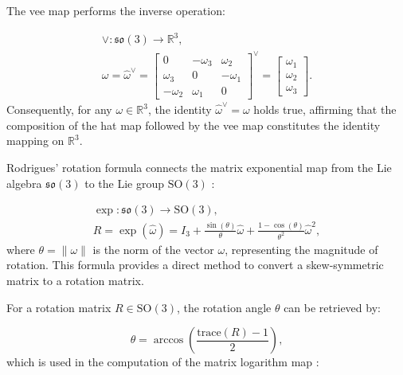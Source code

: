 The vee map performs the inverse operation:

\begin{equation}
    \begin{aligned}
        \vee : \mathfrak{so}(3) \rightarrow \mathbb{R}^3, \\
        \omega = \hat{\omega}^\vee =
        \begin{bmatrix} 0 & -\omega_3 & \omega_2 \\ \omega_3 & 0 & -\omega_1 \\ -\omega_2 & \omega_1 & 0 \end{bmatrix}^\vee
        =
        \begin{bmatrix} \omega_1 \\ \omega_2 \\ \omega_3 \end{bmatrix}.
    \end{aligned}
    \label{eq:vee_SO3}
\end{equation}
Consequently, for any \(\omega \in \mathbb{R}^3\), the identity \(\hat{\omega}^\vee = \omega\) holds true, affirming that the composition of the hat map followed by the vee map constitutes the identity mapping on \(\mathbb{R}^3\).


Rodrigues' rotation formula connects the matrix exponential map from the Lie algebra \(\mathfrak{so}(3)\) to the Lie group \(\mathrm{SO}(3)\) \cite{celledoniLieGroupMethods2003, maInvitation3DVision2004, gallegoCompactFormulaDerivative2015}:

\begin{equation}
    \begin{aligned}
        \exp : \mathfrak{so}(3) \rightarrow \mathrm{SO}(3), \\
        R = \exp(\hat{\omega}) = I_3 + \frac{\sin(\theta)}{\theta} \hat{\omega} + \frac{1 - \cos(\theta)}{\theta^2} \hat{\omega}^2,
    \end{aligned}
    \label{eq:exp_SO3}
\end{equation}
where \(\theta = \|\omega\|\) is the norm of the vector \(\omega\), representing the magnitude of rotation. This formula provides a direct method to convert a skew-symmetric matrix to a rotation matrix.

For a rotation matrix \(R \in \mathrm{SO}(3)\), the rotation angle \(\theta\) can be retrieved by:

\begin{equation}
    \theta = \arccos\left(\frac{\text{trace}(R) - 1}{2}\right),
\end{equation}
which is used in the computation of the matrix logarithm map \cite{shingelInterpolationSpecialOrthogonal2009, gallegoCompactFormulaDerivative2015}:

